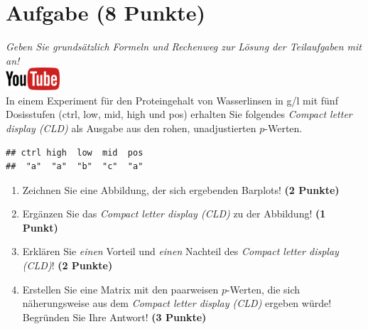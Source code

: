 \documentclass[a4paper, 9pt]{scrartcl}\usepackage[]{graphicx}\usepackage[]{xcolor}
\makeatletter
\newenvironment{kframe}{%
 \def\at@end@of@kframe{}%
 \ifinner\ifhmode%
  \def\at@end@of@kframe{\end{minipage}}%
  \begin{minipage}{\columnwidth}%
 \fi\fi%
 \def\FrameCommand##1{\hskip\@totalleftmargin \hskip-\fboxsep
 \colorbox{shadecolor}{##1}\hskip-\fboxsep
     \hskip-\linewidth \hskip-\@totalleftmargin \hskip\columnwidth}%
 \MakeFramed {\advance\hsize-\width
   \@totalleftmargin\z@ \linewidth\hsize
   \@setminipage}}%
 {\par\unskip\endMakeFramed%
 \at@end@of@kframe}
\newenvironment{knitrout}{}{} %
\makeatother
\begin{document}
\vspace{1Ex}

 
\clearpage

\section{Aufgabe \hfill (8 Punkte)}

\textit{Geben Sie grunds{\"a}tzlich Formeln und Rechenweg zur L{\"o}sung der
  Teilaufgaben mit an!} \\[1Ex]

 \hfill\href{https://youtu.be/xq29O8qDrg0}{\includegraphics[width =
   2cm]{img/youtube}}\\[1Ex]


 
 In einem Experiment f{\"u}r den Proteingehalt von Wasserlinsen in g/l mit f{\"u}nf
 Dosisstufen (ctrl, low, mid, high und pos) erhalten Sie folgendes \textit{Compact
   letter display (CLD)} als \Rlogo Ausgabe aus den rohen, unadjustierten
 $p$-Werten.



\begin{knitrout}
\color{fgcolor}\begin{kframe}
\begin{verbatim}
## ctrl high  low  mid  pos 
##  "a"  "a"  "b"  "c"  "a"
\end{verbatim}
\end{kframe}
\end{knitrout}

\begin{enumerate}
\item Zeichnen Sie eine Abbildung, der sich ergebenden Barplots! \textbf{(2 Punkte)}
\item Erg{\"a}nzen Sie das \textit{Compact letter display (CLD)} zu der
  Abbildung! \textbf{(1 Punkt)}
\item Erkl{\"a}ren Sie \textit{einen} Vorteil und \textit{einen} Nachteil des
  \textit{Compact letter display (CLD)}! \textbf{(2 Punkte)}
\item Erstellen Sie eine Matrix mit den paarweisen $p$-Werten, die sich
  n{\"a}herungsweise aus dem \textit{Compact letter display (CLD)} ergeben w{\"u}rde! Begr{\"u}nden Sie Ihre Antwort! \textbf{(3 Punkte)}
\end{enumerate}
\end{document}
